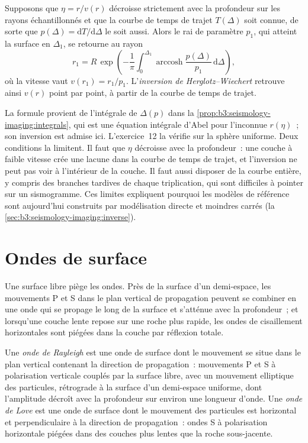 \begin{proposition}\label{prop:b3:seismology-imaging:herglotz}
Supposons que $\eta = r/v(r)$ décroisse strictement avec la profondeur sur les rayons échantillonnés
et que la courbe de temps de trajet $T(\Delta)$ soit connue, de sorte que $p(\Delta) =
\mathrm dT/\mathrm d\Delta$ le soit aussi. Alors le rai de paramètre $p_1$, qui
atteint la surface en $\Delta_1$, se retourne au rayon
\[
  r_1 = R\,\exp\!\left(-\frac1\pi\int_0^{\Delta_1}
  \operatorname{arccosh}\frac{p(\Delta)}{p_1}\,\mathrm d\Delta\right),
\]
où la vitesse vaut $v(r_1) = r_1/p_1$. L'\emph{inversion de Herglotz--Wiechert}
retrouve ainsi $v(r)$
point par point, à partir de la courbe de temps de trajet.
\end{proposition}
\admitted

La formule provient de l'intégrale de $\Delta(p)$ dans
la \cref{prop:b3:seismology-imaging:integrals}, qui est une équation intégrale d'Abel
pour l'inconnue $r(\eta)$~; son inversion est admise ici.
L'exercice~12 la vérifie sur la sphère uniforme. Deux conditions la limitent. Il faut
que $\eta$ décroisse avec la profondeur~: une couche à faible vitesse crée une lacune dans la
courbe de temps de trajet, et l'inversion ne peut pas voir à l'intérieur de la couche. Il faut aussi
disposer de la courbe entière, y compris des branches tardives de chaque triplication, qui sont
difficiles à pointer sur un sismogramme. Ces limites expliquent pourquoi les modèles de référence sont aujourd'hui
construits par modélisation directe et moindres carrés (la \cref{sec:b3:seismology-imaging:inverse}).

\section{Ondes de surface}

Une surface libre piège les ondes. Près de la surface d'un demi-espace, les mouvements P et S
dans le plan vertical de propagation peuvent se combiner en une onde qui se propage le long
de la surface et s'atténue avec la profondeur~; et lorsqu'une couche lente repose sur une
roche plus rapide, les ondes de cisaillement horizontales sont piégées dans la couche par réflexion totale.

\begin{definition}\label{def:b3:seismology-imaging:surface-waves}
Une \emph{onde de Rayleigh} est une onde de surface dont le mouvement
se situe dans le plan vertical contenant la direction de propagation~:
mouvements P et S à polarisation verticale couplés par la surface libre, avec un
mouvement elliptique des particules, rétrograde à la surface d'un demi-espace uniforme,
dont l'amplitude décroît avec la profondeur sur environ une longueur d'onde. Une
\emph{onde de Love} est une onde de surface dont le mouvement des particules est horizontal
et perpendiculaire à la direction de propagation~: ondes S à polarisation horizontale
piégées dans des couches plus lentes que la roche sous-jacente.
\end{definition}

